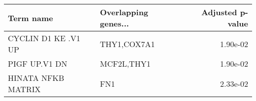 \begin{tabular}{llr}
\toprule
          Term name & Overlapping genes... &  Adjusted p-value \\
\midrule
CYCLIN D1 KE .V1 UP &          THY1,COX7A1 &          1.90e-02 \\
      PIGF UP.V1 DN &           MCF2L,THY1 &          1.90e-02 \\
 HINATA NFKB MATRIX &                  FN1 &          2.33e-02 \\
\bottomrule
\end{tabular}
